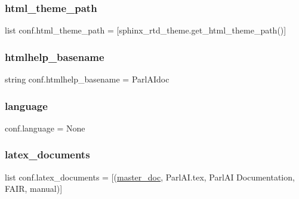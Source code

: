 \subsubsection{\texorpdfstring{html\+\_\+theme\+\_\+path}{html\_theme\_path}}
{\footnotesize\ttfamily list conf.\+html\+\_\+theme\+\_\+path = \mbox{[}sphinx\+\_\+rtd\+\_\+theme.\+get\+\_\+html\+\_\+theme\+\_\+path()\mbox{]}}

\mbox{\label{namespaceconf_aab7fddb2766ce3c430d8246fbfdbc7b1}} 
\subsubsection{\texorpdfstring{htmlhelp\+\_\+basename}{htmlhelp\_basename}}
{\footnotesize\ttfamily string conf.\+htmlhelp\+\_\+basename = \textquotesingle{}Parl\+A\+Idoc\textquotesingle{}}

\mbox{\label{namespaceconf_ad76a2e6d7bfa880ebb4042c08e8b4e12}} 
\subsubsection{\texorpdfstring{language}{language}}
{\footnotesize\ttfamily conf.\+language = None}

\mbox{\label{namespaceconf_a7812f49970f3de0d15dd7b9b9a10e3a1}} 
\subsubsection{\texorpdfstring{latex\+\_\+documents}{latex\_documents}}
{\footnotesize\ttfamily list conf.\+latex\+\_\+documents = \mbox{[}(\hyperlink{namespaceconf_a6fcd7e5236f355b1e1a55f9d95988810}{master\+\_\+doc}, \textquotesingle{}Parl\+A\+I.\+tex\textquotesingle{}, \textquotesingle{}Parl\+AI Documentation\textquotesingle{}, \textquotesingle{}F\+A\+IR\textquotesingle{}, \textquotesingle{}manual\textquotesingle{})\mbox{]}}

\mbox{\label{namespaceconf_a33619d385ad23765ac6ebb58bf82d43d}} 

